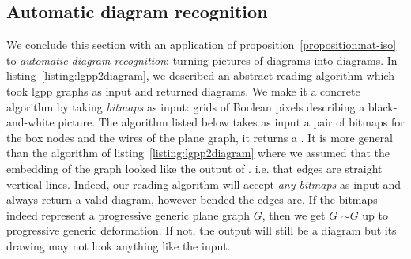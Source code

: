 \subsection{Automatic diagram recognition}

We conclude this section with an application of proposition~\ref{proposition:nat-iso} to \emph{automatic diagram recognition}: turning pictures of diagrams into diagrams.
In listing~\ref{listing:lgpp2diagram}, we described an abstract reading algorithm which took lgpp graphs as input and returned diagrams.
We make it a concrete algorithm by taking \emph{bitmaps} as input: grids of Boolean pixels describing a black-and-white picture.
The algorithm  listed below takes as input a pair of bitmaps for the box nodes and the wires of the plane graph, it returns a .
It is more general than the  algorithm of listing~\ref{listing:lgpp2diagram} where we assumed that the embedding of the graph looked like the output of . i.e. that edges are straight vertical lines.
Indeed, our reading algorithm will accept \emph{any bitmaps} as input and always return a valid diagram, however bended the edges are.
If the bitmaps indeed represent a progressive generic plane graph $G$, then we get  $G$  $\sim G$ up to progressive generic deformation.
If not, the output will still be a diagram but its drawing may not look anything like the input.

